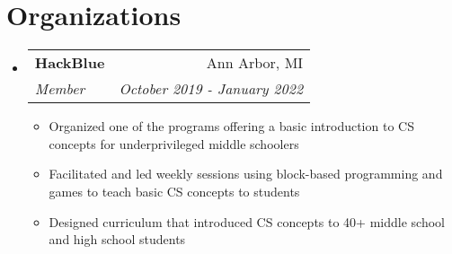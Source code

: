 \documentclass[letterpaper,11pt]{article}
\makeatletter
\newcommand{\resumeItem}[1]{
  \item\small{
    {#1 \vspace{-2pt}}
  }
}
\newcommand{\resumeSubheading}[4]{
  \vspace{-2pt}\item
    \begin{tabular*}{0.97\textwidth}[t]{l@{\extracolsep{\fill}}r}
      \textbf{#1} & #2 \\
      \textit{\small#3} & \textit{\small #4} \\
    \end{tabular*}\vspace{-7pt}
}
\newcommand{\resumeSubSubheading}[2]{
    \item
    \begin{tabular*}{0.97\textwidth}{l@{\extracolsep{\fill}}r}
      \textit{\small#1} & \textit{\small #2} \\
    \end{tabular*}\vspace{-7pt}
}
\newcommand{\resumeSubHeadingListStart}{\begin{itemize}[leftmargin=0.15in, label={}]}
\newcommand{\resumeSubHeadingListEnd}{\end{itemize}}
\newcommand{\resumeItemListStart}{\begin{itemize}}
\newcommand{\resumeItemListEnd}{\end{itemize}\vspace{-5pt}}
\makeatother
\begin{document}
\section{Organizations}
 \resumeSubHeadingListStart

    \resumeSubheading
      {HackBlue}{Ann Arbor, MI}
      {Member}{October 2019 - January 2022}
      \resumeItemListStart
        \resumeItem{Organized one of the programs offering a basic introduction to CS concepts for underprivileged middle schoolers}\resumeItem{Facilitated and led weekly sessions using block-based programming and games to teach basic CS concepts to students}
        \resumeItem{Designed curriculum that introduced CS concepts to 40+ middle school and high school students}
      \resumeItemListEnd
      

  \resumeSubHeadingListEnd
\end{document}
